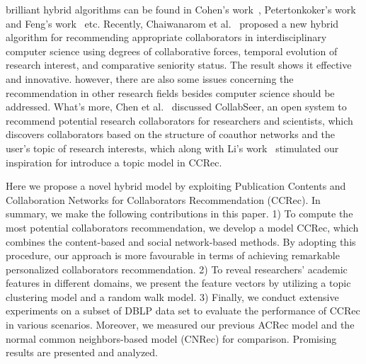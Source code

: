 \documentclass[10pt,letterpaper]{article}
\begin{document}
brilliant hybrid algorithms can be found in Cohen's work~\cite{cohen2013recommending}, Petertonkoker's work~\cite{petertonkoker2014scientific} and Feng's work~\cite{xia2014socially} etc. Recently, Chaiwanarom et al.~\cite{chaiwanarom2014collaborator} proposed a new hybrid algorithm for recommending appropriate collaborators in interdisciplinary computer science using degrees of collaborative forces, temporal evolution of research interest, and comparative seniority status. The result shows it effective and innovative. however, there are also some issues concerning the recommendation in other research fields besides computer science should be addressed. What's more, Chen et al.~\cite{chen2011collabseer} discussed CollabSeer, an open system to recommend potential research collaborators for researchers and scientists, which discovers collaborators based on the structure of coauthor networks and the user's topic of research interests, which along with Li's work~\cite{li2014author} stimulated our inspiration for introduce a topic model in CCRec.

Here we propose a novel hybrid model by exploiting Publication Contents and Collaboration Networks for Collaborators Recommendation (CCRec). In summary, we make the following contributions in this paper. 1) To compute the most potential collaborators recommendation, we develop a model CCRec, which combines the content-based and social network-based methods. By adopting this procedure, our approach is more favourable in terms of achieving remarkable personalized collaborators recommendation. 2) To reveal researchers' academic features in different domains, we present the feature vectors by utilizing a topic clustering model and a random walk model. 3) Finally, we conduct extensive experiments on a subset of DBLP data set to evaluate the performance of CCRec in various scenarios. Moreover, we measured our previous ACRec model and the normal common neighbors-based model (CNRec) for comparison. Promising results are presented and analyzed.


\end{document}
